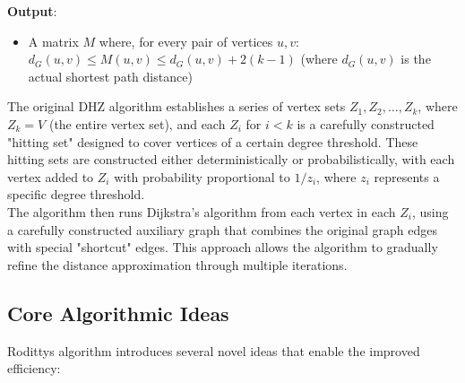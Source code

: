 \documentclass[a4paper,11pt,oneside]{book}
\begin{document}
\textbf{Output}: 
\begin{itemize}
    \item A matrix $M$ where, for every pair of vertices $u, v$: $d_G(u, v) \leq M(u, v) \leq d_G(u, v) + 2(k-1)$ (where $d_G(u, v)$ is the actual shortest path distance)
\end{itemize}

The original DHZ algorithm establishes a series of vertex sets $Z_1, Z_2, \ldots, Z_k$, where $Z_k = V$ (the entire vertex set), and each $Z_i$ for $i < k$ is a carefully constructed "hitting set" designed to cover vertices of a certain degree threshold. These hitting sets are constructed either deterministically or probabilistically, with each vertex added to $Z_i$ with probability proportional to $1/z_i$, where $z_i$ represents a specific degree threshold.\\

The algorithm then runs Dijkstra's algorithm from each vertex in each $Z_i$, using a carefully constructed auxiliary graph that combines the original graph edges with special "shortcut" edges. This approach allows the algorithm to gradually refine the distance approximation through multiple iterations.\\

\subsection{Core Algorithmic Ideas}

Rodittys algorithm introduces several novel ideas that enable the improved efficiency:
\end{document}

